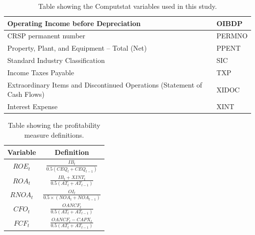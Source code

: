 {\begin{table}[htb!]
\begin{tabular}{|l|l|}
Operating Income before Depreciation                                       & OIBDP         \\ \hline
CRSP permanent number                                                      & PERMNO        \\ \hline
Property, Plant, and Equipment – Total (Net)                               & PPENT         \\ \hline
Standard Industry Classification                                           & SIC           \\ \hline
Income Taxes Payable                                                       & TXP           \\ \hline
Extraordinary Items and Discontinued Operations (Statement of Cash Flows)  & XIDOC         \\ \hline
Interest Expense                                                           & XINT          \\ \hline
\end{tabular}
\caption{Table showing the Computstat variables used in this study.}
\label{tab:CompustatVariables}
\end{table}

{\renewcommand{\arraystretch}{2}
\begin{table}[htb!]
\centering
\begin{tabular}{|c|c|}
\hline
\textbf{Variable} & \textbf{Definition}                           \\ \hline
$ROE_t$           & $\frac{IB_t}{0.5(CEQ_t + CEQ_{t-1})}$         \\ \hline
$ROA_t$           & $\frac{IB_t + XINT_t}{0.5(AT_t + AT_{t-1})}$    \\ \hline
$RNOA_t$          & $\frac{OI_t}{0.5 \times (NOA_t + NOA_{t-1})}$ \\ \hline
$CFO_t$           & $\frac{OANCF_t}{0.5(AT_t + AT_{t-1})}$          \\ \hline
$FCF_t$           & $\frac{OANCF_t - CAPX_t}{0.5(AT_t + AT_{t-1})}$ \\ \hline
\end{tabular}
\caption{Table showing the profitability measure definitions.}
\label{tab:ProfitMeasures} 

\end{table}


}}
